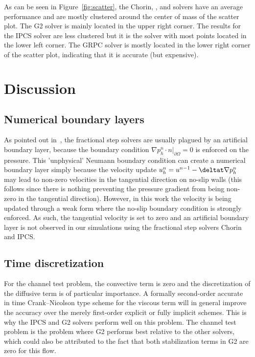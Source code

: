 As can be seen in Figure~\ref{fig:scatter}, the Chorin, , and
 solvers have an average performance and are mostly clustered
around the center of mass of the scatter plot. The G2 solver is mainly
located in the upper right corner. The results for the IPCS solver are
less clustered but it is the solver with most points located in the
lower left corner. The GRPC solver is mostly located in the lower right
corner of the scatter plot, indicating that it is accurate (but
expensive).

\section{Discussion}
\label{Discussion}

\subsection{Numerical boundary layers}

As pointed out in~\cite{guemin}, the fractional step solvers are
usually plagued by an artificial boundary layer, because the boundary
condition $ \nabla p^n_h \cdot n |_{\partial\Omega}=0$ is enforced on
the pressure. This 'unphysical' Neumann boundary condition can create
a numerical boundary layer simply because the velocity update
$u^{n}_h=u^{n-1}-\deltat\nabla p^n_h$ may lead to non-zero velocities in
the tangential direction on no-slip walls (this follows since there is
nothing preventing the pressure gradient from being non-zero in the
tangential direction). However, in this work the velocity is being
updated through a weak form where the no-slip boundary condition is
strongly enforced. As such, the tangential velocity is set to zero and
an artificial boundary layer is not observed in our simulations using
the fractional step solvers Chorin and IPCS.

\subsection{Time discretization}

For the channel test problem, the convective term is zero and the
discretization of the diffusive term is of particular importance. A
formally second-order accurate in time Crank--Nicolson type scheme for
the viscous term will in general improve the accuracy over the merely
first-order explicit or fully implicit schemes. This is why the IPCS
and G2 solvers perform well on this problem. The channel test problem
is the problem where G2 performs best relative to the other solvers,
which could also be attributed to the fact that both stabilization
terms in G2 are zero for this flow.

